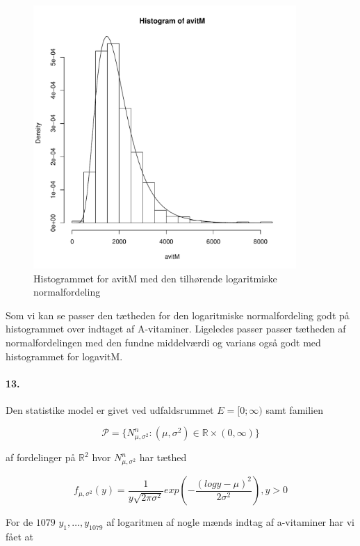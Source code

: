 \begin{figure}[H]
\label{fig:anal14}
\begin{center}
\includegraphics[width=10cm]{graphs/analyse_6.pdf}
\caption{Histogrammet for avitM med den tilhørende logaritmiske normalfordeling}
\end{center}
\end{figure}

Som vi kan se passer den tætheden for den logaritmiske normalfordeling
godt på histogrammet over indtaget af A-vitaminer. Ligeledes passer
passer tætheden af normalfordelingen med den fundne middelværdi og
varians også godt med histogrammet for logavitM.

\paragraph{13.}
Den statistike model er givet ved udfaldsrummet $E=[0; \infty)$ samt
  familien

\begin{equation*}
  \mathcal{P} =\{ N^n_{\mu,\sigma^2} : (\mu, \sigma^2) \in \mathbb{R}
  \times (0, \infty) \}
\end{equation*}

af fordelinger på $\mathbb{R}^2$ hvor $N^n_{\mu, \sigma^2}$ har tæthed

\begin{equation*}
  f_{\mu, \sigma^2}(y) = \frac{1}{y \sqrt{2\pi\sigma^2}} exp ( -
  \frac{(log y - \mu)^2}{2\sigma^2} ), y>0
\end{equation*}

For de $1079$ $y_1, \ldots, y_{1079}$ af logaritmen af nogle mænds
indtag af a-vitaminer har vi fået at

